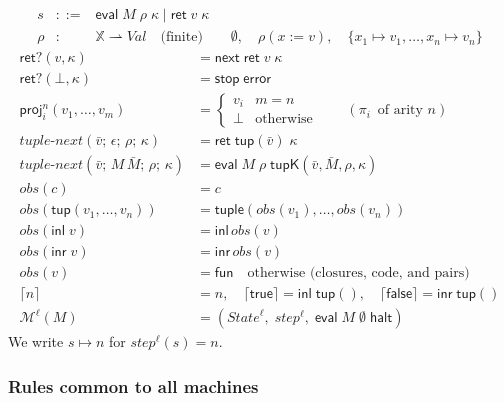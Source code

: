 \documentclass[10pt]{article}
\theoremstyle{acmplain}
\newcommand{\key}[1]{\mathsf{#1}}
\newcommand{\inl}{\key{inl}\,}
\newcommand{\inr}{\key{inr}\,}
\newcommand{\prj}[1]{\pi_{#1}\,}
\newcommand{\X}{\mathbb{X}}
\newcommand{\res}[1]{\lceil #1 \rceil}
\newcommand{\ext}[3]{#1(#2{:=}#3)}
\newcommand{\ev}[3]{\key{eval}\;#1\;#2\;#3}
\newcommand{\rt}[2]{\key{ret}\;#1\;#2}
\newcommand{\nxt}{\key{next}\;}
\newcommand{\stp}{\key{stop}\;}
\newcommand{\error}{\key{error}}
\newcommand{\retq}{\key{ret?}}
\newcommand{\Mach}[1]{\mathcal{M}^{#1}}
\newcommand{\step}[1]{\mathit{step}^{#1}}
\newcommand{\obs}{\mathit{obs}}
\newcommand{\tupV}[1]{\key{tup}(#1)}
\newcommand{\inlV}{\key{inl}\;}
\newcommand{\inrV}{\key{inr}\;}
\newcommand{\Kf}[2]{\key{#1}(#2)}
\newcommand{\halt}{\key{halt}}
\newcommand{\tnext}{\mathit{tuple\text{-}next}}
\begin{document}
\[
\begin{array}{rcl}
  s &::=& \ev{M}{\rho}{\kappa} \mid \rt{v}{\kappa} \\
  \rho &:& \X \rightharpoonup \mathit{Val} \quad \text{(finite)} \qquad
  \emptyset, \quad \ext{\rho}{x}{v}, \quad \{x_1 {\mapsto} v_1, \ldots, x_n {\mapsto} v_n\}
\end{array}
\]
\begin{align*}
  \retq(v, \kappa) &= \nxt \rt{v}{\kappa} \\
  \retq(\bot, \kappa) &= \stp \error \\[1ex]
  \key{proj}^n_i(v_1, \ldots, v_m) &=
    \begin{cases} v_i & m = n \\ \bot & \text{otherwise} \end{cases}
    \qquad (\prj{i} \text{ of arity } n) \\[1ex]
  \tnext(\bar{v};\, \epsilon;\, \rho;\, \kappa) &= \rt{\tupV{\bar{v}}}{\kappa} \\
  \tnext(\bar{v};\, M\,\bar{M};\, \rho;\, \kappa) &= \ev{M}{\rho}{\Kf{tupK}{\bar{v}, \bar{M}, \rho, \kappa}} \\[1ex]
  \obs(c) &= c \\
  \obs(\tupV{v_1, \ldots, v_n}) &= \key{tuple}(\obs(v_1), \ldots, \obs(v_n)) \\
  \obs(\inlV v) &= \inl \obs(v) \\
  \obs(\inrV v) &= \inr \obs(v) \\
  \obs(v) &= \key{fun} \quad \text{otherwise (closures, code, and pairs)} \\[1ex]
  \res{n} &= n, \quad \res{\mathsf{true}} = \inlV \tupV{}, \quad \res{\mathsf{false}} = \inrV \tupV{} \\[1ex]
  \Mach{\ell}(M) &= (\mathit{State}^{\ell},\; \step{\ell},\; \ev{M}{\emptyset}{\halt})
\end{align*}
We write $s \mapsto n$ for $\step{\ell}(s) = n$.

\subsubsection{Rules common to all machines}
\end{document}
